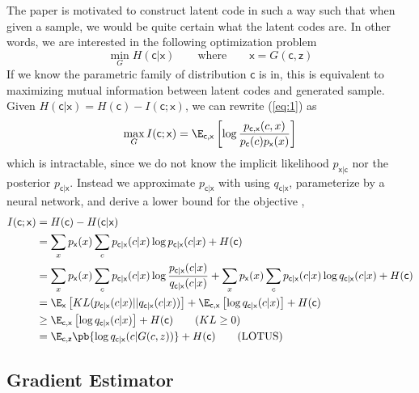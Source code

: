 \documentclass[11pt]{article}
\newcommand\rx{\ensuremath{\mathsf{x}}}
\newcommand\rc{\ensuremath{\mathsf{c}}}
\newcommand\rz{\ensuremath{\mathsf{z}}}
\begin{document}
The paper is motivated to construct latent code in such a way such that when given a sample, we would be quite certain what the latent codes are. In other words, we are interested in the following optimization problem 
\begin{equation}
    \label{eq:1}
    \min_{G} H(\rc|\rx) 
    \quad\quad \text{where}\quad\quad
    \rx = G(\rc,\rz)
\end{equation}
If we know the parametric family of distribution $\rc$ is in, this is equivalent to maximizing mutual information between latent codes and generated sample. Given $H(\rc|\rx) = H(\rc) - I(\rc;\rx)$, we can rewrite (\ref{eq:1}) as
\[
    \max_G I(\rc; \rx) 
        = \E_{\rc,\rx}\left[ \log \frac{p_{\rc,\rx}(c,x) }{p_{\rc}(c) p_{\rx}(x)} \right]
\]
which is intractable, since we do not know the implicit likelihood $p_{\rx|\rc}$ nor the posterior $p_{\rc|\rx}$. Instead we approximate $p_{\rc|\rx}$ with using $q_{\rc|\rx}$, parameterize by a neural network, and derive a lower bound for the objective \cite{barberIMAlgorithmVariational2003,pooleVariationalBoundsMutual2019},
\begin{align*}
    I(\rc;\rx)
        &= H(\rc) - H(\rc|\rx) \\
        &= \sum_{x} p_{\rx}(x) \sum_{c} p_{\rc|\rx}(c|x) \log p_{\rc|\rx}(c|x) + H(\rc) \\
        &= \sum_{x} p_{\rx}(x) \sum_{c} p_{\rc|\rx}(c|x) \log \frac{p_{\rc|\rx}(c|x)}{q_{\rc|\rx}(c|x)} + \sum_{x} p_{\rx}(x) \sum_{c} p_{\rc|\rx}(c|x) \log q_{\rc|\rx}(c|x) + H(\rc) \\
        &= \E_{\rx} \left[ KL(p_{\rc|\rx}(c|x) || q_{\rc|\rx}(c|x)) \right] + \E_{\rc,\rx} \left[ \log q_{\rc|\rx}(c|x) \right] + H(\rc) \\
        &\geq  \E_{\rc,\rx} \left[ \log q_{\rc|\rx}(c|x) \right] + H(\rc)  \tag{$KL \geq 0$} \\
        &= \E_{\rc,\rz} \pb{ \log q_{\rc|\rx}(c|G(c,z)) } + H(\rc) \tag{LOTUS}
\end{align*}

\subsection{Gradient Estimator}
\end{document}
